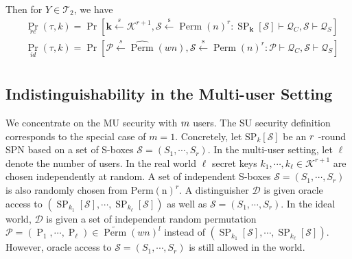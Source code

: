 Then for $Y \in \mathcal{T}_{2}$, we have
$$
\begin{aligned}
&\operatorname{Pr}_{r e}(\tau, k) = \operatorname{Pr}\left[\mathbf{k} \stackrel{s}{\leftarrow} \mathcal{K}^{r+1}, \mathcal{S} \stackrel{\mathrm{s}}{\leftarrow} \operatorname{Perm}(n)^{r}: \operatorname{SP}_{\mathbf{k}}[\mathcal{S}] \vdash \mathcal{Q}_{C}, \mathcal{S} \vdash \mathcal{Q}_{S}\right]\\
&\operatorname{Pr}_{i d}(\tau, k) = \operatorname{Pr}\left[\mathcal{P} \stackrel{s}{\leftarrow} \widehat{\operatorname{Perm}}(w n), \mathcal{S} \stackrel{\mathrm{s}}{\leftarrow} \operatorname{Perm}(n)^{r}: \mathcal{P} \vdash \mathcal{Q}_{C}, \mathcal{S} \vdash \mathcal{Q}_{S}\right]\\
\end{aligned}
$$


\subsection{Indistinguishability in the Multi-user Setting}
We concentrate on the MU security with $\mathnormal{m}$  users. The SU security definition corresponds to the special case of $m=1$. Concretely, let $\mathrm{SP}_k[\mathcal{S}]$ be an $\mathnormal{r}$ -round SPN based on a set of S-boxes  $\mathcal{S}=(S_1, \cdots  ,S_r)$. In  the multi-user setting, let $\ell$ denote the number of users. In the real world $\ell$ secret keys  $k_1,\cdots ,k_{\ell} \in \mathcal{K}^{r+1}$  are chosen independently at random. A set of independent S-boxes $\mathcal{S}=(S_1, \cdots  ,S_r)$ is also randomly chosen from  $\operatorname{Perm(n)}^r$. A distinguisher $\mathcal{D}$  is given oracle access to $(\operatorname{SP}_{k_1}[\mathcal{S}], \cdots ,\operatorname{SP}_{k_{\ell}}[\mathcal{S}])$ as well as $\mathcal{S}=(S_1, \cdots  ,S_r)$. In the ideal world, $\mathcal{D}$ is given a set of independent random permutation $\mathcal{P} = (\operatorname{P}_1, \cdots ,\operatorname{P}_{\ell}) \in \widetilde{\operatorname{Perm}}(wn)^l$ instead of $(\operatorname{SP}_{k_1}[\mathcal{S}], \cdots ,\operatorname{SP}_{k_{\ell}}[\mathcal{S}])$. However, oracle access to $\mathcal{S}=(S_1, \cdots  ,S_r)$ is still allowed in the world. \\

